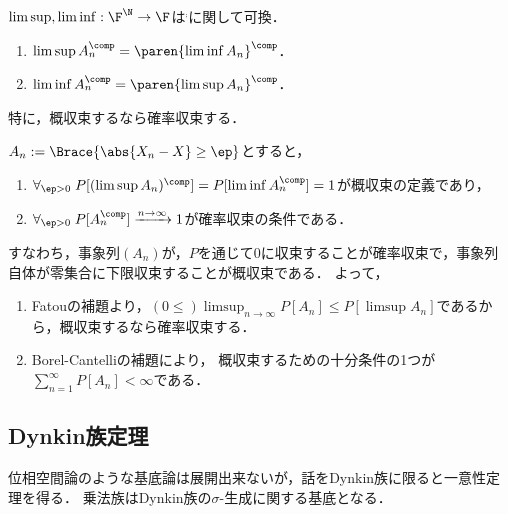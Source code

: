 \documentclass[uplatex,dvipdfmx]{jsreport}
\begin{document}
\begin{lemma}[概収束するならば確率収束する]
    $\limsup,\liminf:\F^\N\to\F$は${}^\comp$に関して可換．
    \begin{enumerate}
        \item $\limsup A_n^\comp=\paren{\liminf A_n}^\comp$．
        \item $\liminf A_n^\comp=\paren{\limsup A_n}^\comp$．
    \end{enumerate}
    特に，概収束するなら確率収束する．
\end{lemma}
\begin{remarks}
    $A_n:=\Brace{\abs{X_n-X}\ge\ep}$とすると，
    \begin{enumerate}
        \item $\forall_{\ep>0}\;P[(\limsup A_n)^\comp]=P[\liminf A_n^\comp]=1$が概収束の定義であり，
        \item $\forall_{\ep>0}\;P[A_n^\comp]\xrightarrow{n\to\infty}1$が確率収束の条件である．
    \end{enumerate}
    すなわち，事象列$(A_n)$が，$P$を通じて0に収束することが確率収束で，事象列自体が零集合に下限収束することが概収束である．
    よって，
    \begin{enumerate}
        \item Fatouの補題より，$(0\le)\limsup_{n\to\infty}P[A_n]\le P[\limsup A_n]$であるから，概収束するなら確率収束する．
        \item Borel-Cantelliの補題により，
        概収束するための十分条件の1つが$\sum^\infty_{n=1}P[A_n]<\infty$である．
    \end{enumerate}
\end{remarks}

\subsection{Dynkin族定理}

\begin{tcolorbox}[colframe=ForestGreen, colback=ForestGreen!10!white,breakable,colbacktitle=ForestGreen!40!white,coltitle=black,fonttitle=\bfseries\sffamily,
title=]
    位相空間論のような基底論は展開出来ないが，話をDynkin族に限ると一意性定理を得る．
    乗法族はDynkin族の$\sigma$-生成に関する基底となる．
\end{tcolorbox}
\end{document}
